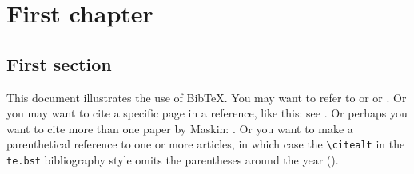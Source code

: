 \documentclass[english,a4paper,pdftex]{report}
\begin{document}

\newpage
\tableofcontents

\chapter{First chapter}
\section{First section}

This document illustrates the use of BibTeX\@.  You may want to refer to
\cite{h11} or \citeyear{ab94} or \citet{m85}.  Or you may want to cite a
specific page in a reference, like this: see \citet[p.~199]{m85}.  Or
perhaps you want to cite more than one paper by Maskin: \cite{m85}.
Or you want to make a parenthetical reference to one or more articles, in
which case the \verb+\citealt+ in the \texttt{te.bst} bibliography style
omits the parentheses around the year (\citealt{ahu61}).





\end{document}

